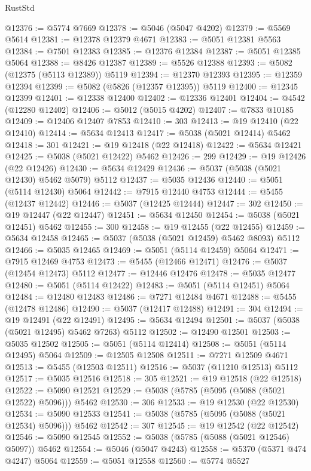 \begin{lexlean}{RustStd}
\begin{coremodule}
@12376 := @5774 @7669
@12378 := @5046 (@5047 @4202)
@12379 := @5569 @5614
@12381 := @12378 @12379 @4671
@12383 := @5051 @12381 @5563
@12384 := @7501 @12383
@12385 := @12376 @12384
@12387 := @5051 @12385 @5064
@12388 := @8426 @12387
@12389 := @5526 @12388
@12393 := @5082 (@12375 (@5113 @12389)) @5119
@12394 := @12370 @12393
@12395 := @12359 @12394
@12399 := @5082 (@5826 (@12357 @12395)) @5119
@12400 := @12345 @12399
@12401 := @12338 @12400
@12402 := @12336 @12401
@12404 := @4542 (@12280 @12402)
@12406 := @5012 (@5015 @4202)
@12407 := @7833 @10185
@12409 := @12406 @12407 @7853
@12410 := 303
@12413 := @19 @12410 (@22 @12410)
@12414 := @5634 @12413
@12417 := @5038 (@5021 @12414) @5462
@12418 := 301
@12421 := @19 @12418 (@22 @12418)
@12422 := @5634 @12421
@12425 := @5038 (@5021 @12422) @5462
@12426 := 299
@12429 := @19 @12426 (@22 @12426)
@12430 := @5634 @12429
@12436 := @5037 (@5038 (@5021 @12430) @5462 @5079) @5112
@12437 := @5035 @12436
@12440 := @5051 (@5114 @12430) @5064
@12442 := @7915 @12440 @4753
@12444 := @5455 (@12437 @12442)
@12446 := @5037 (@12425 @12444)
@12447 := 302
@12450 := @19 @12447 (@22 @12447)
@12451 := @5634 @12450
@12454 := @5038 (@5021 @12451) @5462
@12455 := 300
@12458 := @19 @12455 (@22 @12455)
@12459 := @5634 @12458
@12465 := @5037 (@5038 (@5021 @12459) @5462 @8093) @5112
@12466 := @5035 @12465
@12469 := @5051 (@5114 @12459) @5064
@12471 := @7915 @12469 @4753
@12473 := @5455 (@12466 @12471)
@12476 := @5037 (@12454 @12473) @5112
@12477 := @12446 @12476
@12478 := @5035 @12477
@12480 := @5051 (@5114 @12422)
@12483 := @5051 (@5114 @12451) @5064
@12484 := @12480 @12483
@12486 := @7271 @12484 @4671
@12488 := @5455 (@12478 @12486)
@12490 := @5037 (@12417 @12488)
@12491 := 304
@12494 := @19 @12491 (@22 @12491)
@12495 := @5634 @12494
@12501 := @5037 (@5038 (@5021 @12495) @5462 @7263) @5112
@12502 := @12490 @12501
@12503 := @5035 @12502
@12505 := @5051 (@5114 @12414)
@12508 := @5051 (@5114 @12495) @5064
@12509 := @12505 @12508
@12511 := @7271 @12509 @4671
@12513 := @5455 (@12503 @12511)
@12516 := @5037 (@11210 @12513) @5112
@12517 := @5035 @12516
@12518 := 305
@12521 := @19 @12518 (@22 @12518)
@12522 := @5090 @12521
@12529 := @5038 (@5785 (@5095 (@5088 (@5021 @12522) @5096))) @5462
@12530 := 306
@12533 := @19 @12530 (@22 @12530)
@12534 := @5090 @12533
@12541 := @5038 (@5785 (@5095 (@5088 (@5021 @12534) @5096))) @5462
@12542 := 307
@12545 := @19 @12542 (@22 @12542)
@12546 := @5090 @12545
@12552 := @5038 (@5785 (@5088 (@5021 @12546) @5097)) @5462
@12554 := @5046 (@5047 @4243)
@12558 := @5370 (@5371 @474 @4247) @5064
@12559 := @5051 @12558
@12560 := @5774 @5527

\end{coremodule}
\end{lexlean}
